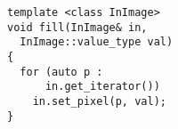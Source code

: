 \documentclass[varwidth=4cm,border={0.1cm 0.1cm 0.1cm 0.1cm}]{standalone}
\begin{document}
\begin{verbatim}
template <class InImage>
void fill(InImage& in,
  InImage::value_type val)
{
  for (auto p :
      in.get_iterator())
    in.set_pixel(p, val);
}
\end{verbatim}
\end{document}
